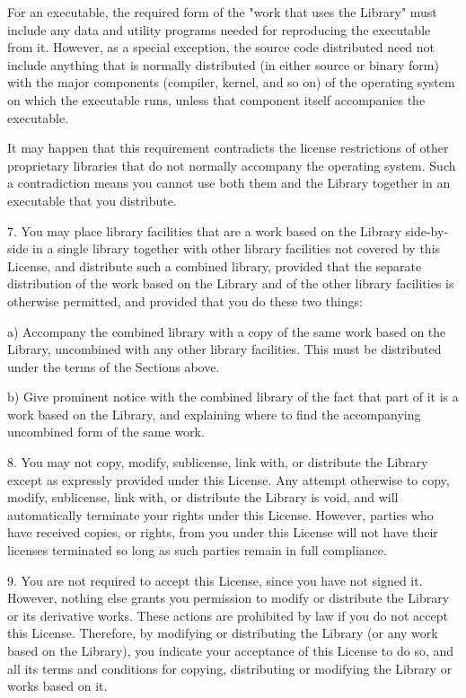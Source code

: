 \documentclass[twoside]{tceusermanual}
\begin{document}
For an executable, the required form of the "work that uses the
Library" must include any data and utility programs needed for
reproducing the executable from it.  However, as a special
exception, the source code distributed need not include anything
that is normally distributed (in either source or binary form)
with the major components (compiler, kernel, and so on) of the
operating system on which the executable runs, unless that
component itself accompanies the executable.

It may happen that this requirement contradicts the license
restrictions of other proprietary libraries that do not normally
accompany the operating system.  Such a contradiction means you
cannot use both them and the Library together in an executable
that you distribute.
 
7. You may place library facilities that are a work based on the
Library side-by-side in a single library together with other
library facilities not covered by this License, and distribute
such a combined library, provided that the separate distribution
of the work based on the Library and of the other library
facilities is otherwise permitted, and provided that you do
these two things:

    a) Accompany the combined library with a copy of the same work
    based on the Library, uncombined with any other library
    facilities.  This must be distributed under the terms of the
    Sections above.

    b) Give prominent notice with the combined library of the fact
    that part of it is a work based on the Library, and explaining
    where to find the accompanying uncombined form of the same work.

8. You may not copy, modify, sublicense, link with, or
distribute the Library except as expressly provided under this
License.  Any attempt otherwise to copy, modify, sublicense,
link with, or distribute the Library is void, and will
automatically terminate your rights under this License.
However, parties who have received copies, or rights, from you
under this License will not have their licenses terminated so
long as such parties remain in full compliance.

9. You are not required to accept this License, since you have
not signed it.  However, nothing else grants you permission to
modify or distribute the Library or its derivative works.  These
actions are prohibited by law if you do not accept this
License.  Therefore, by modifying or distributing the Library
(or any work based on the Library), you indicate your acceptance
of this License to do so, and all its terms and conditions for
copying, distributing or modifying the Library or works based on
it.
\end{document}
